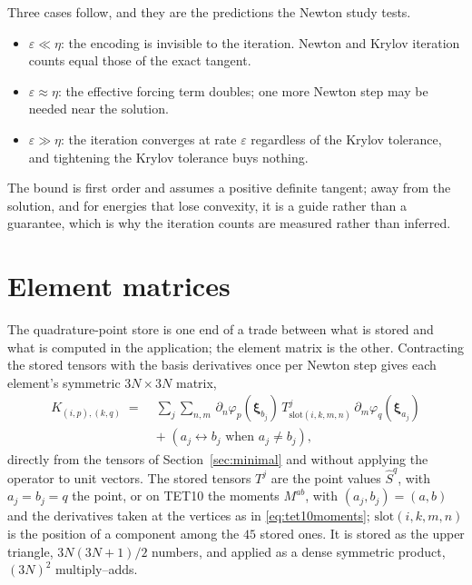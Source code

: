 \documentclass[sigconf,balance=false]{acmart}
\newcommand{\xhat}{\boldsymbol{\xi}}
\newcommand{\Sq}{\widehat{S}^{q}}
\newcommand{\Mab}{M^{ab}}
\newcommand{\eps}{\varepsilon}
\begin{document}
Three cases follow, and they are the predictions the Newton study tests.
\begin{itemize}[leftmargin=1.5em,itemsep=1pt]
\item $\eps\ll\eta$: the encoding is invisible to the iteration.  Newton and Krylov iteration
  counts equal those of the exact tangent.
\item $\eps\approx\eta$: the effective forcing term doubles; one more Newton step may be needed
  near the solution.
\item $\eps\gg\eta$: the iteration converges at rate $\eps$ regardless of the Krylov tolerance,
  and tightening the Krylov tolerance buys nothing.
\end{itemize}
The bound is first order and assumes a positive definite tangent; away from the solution, and for
energies that lose convexity, it is a guide rather than a guarantee, which is why the iteration
counts are measured rather than inferred.

\section{Element matrices}
\label{sec:elementmatrix}

The quadrature-point store is one end of a trade between what is stored and what is computed in
the application; the element matrix is the other.  Contracting the stored tensors with the basis
derivatives once per Newton step gives each element's symmetric $3N\times3N$ matrix,
\begin{equation}
  \begin{split}
  K_{(i,p),(k,q)} \;=\; {}& \sum_{j} \sum_{n,m}\, \partial_n\varphi_p(\xhat_{b_j})\,
      T^{j}_{\mathrm{slot}(i,k,m,n)}\, \partial_m\varphi_q(\xhat_{a_j})\\
      &+\; (a_j\leftrightarrow b_j \text{ when } a_j\ne b_j) ,
  \end{split}
  \label{eq:elementmatrix}
\end{equation}
directly from the tensors of Section~\ref{sec:minimal} and without applying the operator to unit
vectors.  The stored tensors $T^j$ are the point values $\Sq$, with $a_j=b_j=q$ the point, or on TET10
the moments $\Mab$, with $(a_j,b_j)=(a,b)$ and the derivatives taken at the vertices as in
\eqref{eq:tet10moments}; $\mathrm{slot}(i,k,m,n)$ is the position of a component among the $45$
stored ones.  It is stored as the
upper triangle, $3N(3N+1)/2$ numbers, and applied as a dense symmetric product, $(3N)^2$
multiply--adds.
\end{document}
